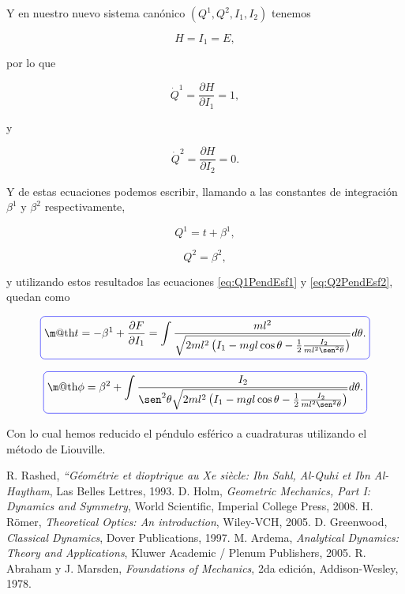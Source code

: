 \documentclass[a4paper,10pt]{article}
\makeatletter
\numberwithin{equation}{section}
\newcommand*{\boxcolor}{blue}
\renewcommand{\boxed}[1]{\textcolor{\boxcolor}{%
\tikz[baseline={([yshift=-1ex]current bounding box.center)}] \node [rectangle, minimum width=1ex,rounded corners,draw] {\normalcolor\m@th$\displaystyle#1$};}}
\makeatother
\begin{document}
Y en nuestro nuevo sistema canónico $(Q^1,Q^2,I_1,I_2)$ tenemos 

\begin{equation}
 H = I_1 = E,
\end{equation}

por lo que 

\begin{equation}
 \dot{Q}^1 = \frac{\partial H}{\partial I_1} = 1,
\end{equation}

y 

\begin{equation}
 \dot{Q}^2 = \frac{\partial H}{\partial I_2} = 0.
\end{equation}

Y de estas ecuaciones podemos escribir, llamando a las constantes de integración 
$\beta^1$ y $\beta^2$ respectivamente, 

\begin{equation}
 Q^1 = t + \beta^1,
\end{equation}

\begin{equation}
 Q^2 = \beta^2,
\end{equation}

y utilizando estos resultados las ecuaciones \eqref{eq:Q1PendEsf1} y \eqref{eq:Q2PendEsf2}, 
quedan como 

\begin{equation}
 \boxed{t = -\beta^1 + \frac{\partial F}{\partial I_1} = \int \frac{ml^2}{\sqrt{2ml^2\left(I_1 -
 mgl\cos{\theta} - \frac{1}{2}\frac{I_2}{ml^2\sen^2{\theta}} \right)}}d\theta.}
\end{equation}

\begin{equation}
 \boxed{\phi = \beta^2 + \int \frac{I_2}{\sen^2{\theta}\sqrt{2ml^2\left(I_1 - mgl\cos{\theta} - 
 \frac{1}{2}\frac{I_2}{ml^2\sen^2{\theta}} \right)}}d\theta.}
\end{equation}

Con lo cual hemos reducido el péndulo esférico a cuadraturas utilizando el método 
de Liouville.

\begin{thebibliography}{10}
R. Rashed, \emph{“Géométrie et dioptrique au Xe siècle: Ibn Sahl, 
Al-Quhi et Ibn Al-Haytham}, Las Belles Lettres, 1993.
D. Holm, \emph{Geometric Mechanics, Part I: Dynamics and Symmetry}, World Scientific, 
Imperial College Press, 2008.
H. Römer, \emph{Theoretical Optics: An introduction}, Wiley-VCH, 2005.
D. Greenwood, \emph{Classical Dynamics}, Dover Publications, 1997.
M. Ardema, \emph{Analytical Dynamics: Theory and Applications}, Kluwer 
Academic / Plenum Publishers, 2005.
 R. Abraham y J. Marsden, \emph{Foundations of Mechanics}, 2da edición, Addison-Wesley,
 1978.
\end{thebibliography}
\end{document}
